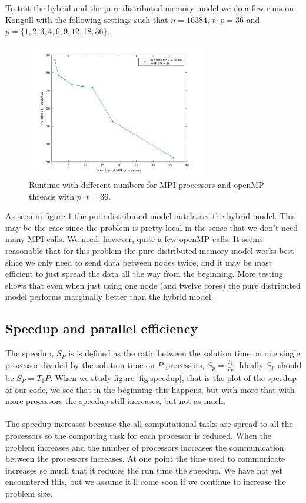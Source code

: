 To test the hybrid and the pure distributed memory model we do a few runs on Kongull with the following settings such that $n = 16384$,  $t\cdot p = 36$ and $p = \{1, 2, 3, 4, 6, 9, 12, 18, 36\}$.
\begin{figure}
\centering
\includegraphics[width=0.7\textwidth]{./figures/pt36}
\caption{Runtime with different numbers for MPI processors and openMP threads with $p\cdot t = 36$.}
\label{fig:runtime}
\end{figure}
As seen in figure \ref{fig:runtime} the pure distributed model outclasses the hybrid model. This may be the case since the problem is pretty local in the sense that we don't need many MPI calls. We need, however, quite a few openMP calls. It seems reasonable that for this problem the pure distributed memory model works best since we only need to send data between nodes twice, and it may be most efficient to just spread the data all the way from the beginning. More testing shows that even when just using one node (and twelve cores) the pure distributed model performs marginally better than the hybrid model.


\subsection*{Speedup and parallel efficiency}
The speedup, $S_P$ is is defined as the ratio between the solution time on one single processor divided by the solution time on $P$ processors, $S_p=\frac{T_1}{T_P}$. Ideally $S_P$ should be $S_P=T_1P$. When we study figure \ref{fig:speedup}, that is the plot of the speedup of our code, we see that in the beginning this happens, but with more that with more processors the speedup still increases, but not as much.
\\ \\
The speedup increases because the all computational tasks are spread to all the processors so the computing task for each processor is reduced. When the problem increases and the number of processors increases the communication between the processors increases. At one point the time used to communicate increases so much that it reduces the run time the speedup. We have not yet encountered this, but we assume it'll come soon if we continue to increase the problem size.

